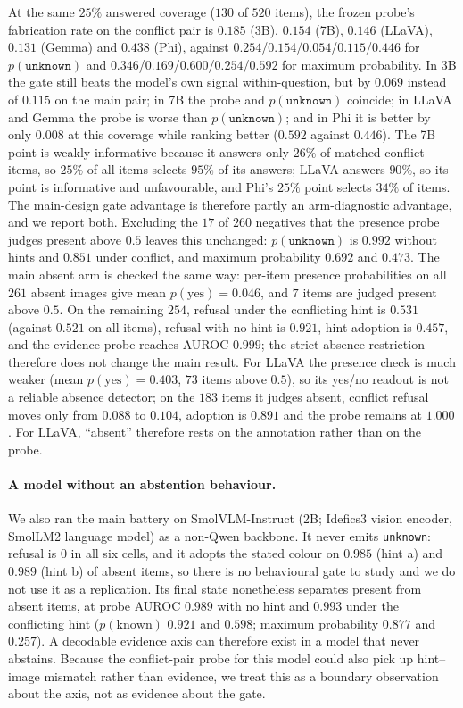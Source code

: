 \documentclass[10pt]{article}
\newcommand{\unknown}{\texttt{unknown}}
\newcommand{\punk}{p(\unknown)}
\begin{document}
At the same $25\%$ answered coverage ($130$ of $520$ items), the frozen probe's fabrication rate on the conflict pair is $0.185$ (3B), $0.154$ (7B), $0.146$ (LLaVA), $0.131$ (Gemma) and $0.438$ (Phi), against $0.254$/$0.154$/$0.054$/$0.115$/$0.446$ for $\punk$ and $0.346$/$0.169$/$0.600$/$0.254$/$0.592$ for maximum probability. In 3B the gate still beats the model's own signal within-question, but by $0.069$ instead of $0.115$ on the main pair; in 7B the probe and $\punk$ coincide; in LLaVA and Gemma the probe is worse than $\punk$; and in Phi it is better by only $0.008$ at this coverage while ranking better ($0.592$ against $0.446$). The 7B point is weakly informative because it answers only $26\%$ of matched conflict items, so $25\%$ of all items selects $95\%$ of its answers; LLaVA answers $90\%$, so its point is informative and unfavourable, and Phi's $25\%$ point selects $34\%$ of items. The main-design gate advantage is therefore partly an arm-diagnostic advantage, and we report both. Excluding the $17$ of $260$ negatives that the presence probe judges present above $0.5$ leaves this unchanged: $\punk$ is $0.992$ without hints and $0.851$ under conflict, and maximum probability $0.692$ and $0.473$. The main absent arm is checked the same way: per-item presence probabilities on all $261$ absent images give mean $p(\text{yes})=0.046$, and $7$ items are judged present above $0.5$. On the remaining $254$, refusal under the conflicting hint is $0.531$ (against $0.521$ on all items), refusal with no hint is $0.921$, hint adoption is $0.457$, and the evidence probe reaches AUROC $0.999$; the strict-absence restriction therefore does not change the main result. For LLaVA the presence check is much weaker (mean $p(\text{yes})=0.403$, $73$ items above $0.5$), so its yes/no readout is not a reliable absence detector; on the $183$ items it judges absent, conflict refusal moves only from $0.088$ to $0.104$, adoption is $0.891$ and the probe remains at $1.000$. For LLaVA, ``absent'' therefore rests on the annotation rather than on the probe.

\paragraph{A model without an abstention behaviour.}
We also ran the main battery on SmolVLM-Instruct (2B; Idefics3 vision encoder, SmolLM2 language model) as a non-Qwen backbone. It never emits \unknown: refusal is $0$ in all six cells, and it adopts the stated colour on $0.985$ (hint a) and $0.989$ (hint b) of absent items, so there is no behavioural gate to study and we do not use it as a replication. Its final state nonetheless separates present from absent items, at probe AUROC $0.989$ with no hint and $0.993$ under the conflicting hint ($p(\text{known})$ $0.921$ and $0.598$; maximum probability $0.877$ and $0.257$). A decodable evidence axis can therefore exist in a model that never abstains. Because the conflict-pair probe for this model could also pick up hint--image mismatch rather than evidence, we treat this as a boundary observation about the axis, not as evidence about the gate.
\end{document}
